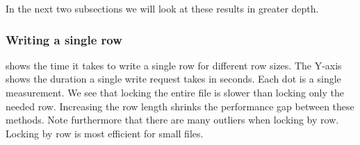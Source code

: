 In the next two subsections we will look at these results in greater depth.
%
\subsubsection*{Writing a single row}
 shows the time it takes to write a single row for different row sizes. The Y-axis shows the duration a single write request takes in seconds. Each dot is a single measurement. We see that locking the entire file is slower than locking only the needed row. Increasing the row length shrinks the performance gap between these methods. Note furthermore that there are many outliers when locking by row. Locking by row is most efficient for small files.

